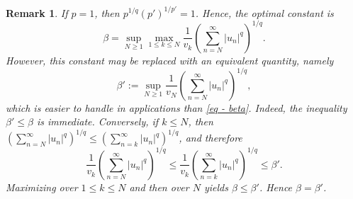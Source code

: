 \documentclass[oneside,10pt]{article}          %
\newtheorem{thm}{Theorem}
\newtheorem{rem}{Remark}
\numberwithin{equation}{section}
\begin{document}
\begin{rem}
    If $p=1$, then $p^{1/q}(p')^{1/p'}=1$. Hence, the optimal constant is \vspace{-1.5pt}
    \begin{equation}\label{eq - beta}
        \beta = \sup_{N\ge1} \max_{1\leq k \leq N} \frac{1}{v_k}\left(\sum_{n=N}^{\infty} |u_n|^q\right)^{\!\!1/q}.
    \end{equation}
    However, this constant may be replaced with an equivalent quantity, namely\vspace{-1.5pt}
    $$
        \beta' := \sup_{N \geq 1} \frac{1}{v_N} \left( \sum_{n = N}^\infty |u_n|^q \right)^{1/q}, 
    $$
    which is easier to handle in applications than \eqref{eq - beta}. Indeed, the inequality $\beta'\le\beta$ is immediate. Conversely, if $k\le N$, then $\left(\sum_{n=N}^{\infty} |u_n|^q\right)^{1/q}\le \left(\sum_{n=k}^{\infty} |u_n|^q\right)^{1/q}$, and therefore
    \[
    \frac{1}{v_k}\left(\sum_{n=N}^{\infty} |u_n|^q\right)^{\!\!1/q}
    \le
    \frac{1}{v_k}\left(\sum_{n=k}^{\infty} |u_n|^q\right)^{\!\!1/q}
    \le
    \beta' .
    \]
    Maximizing over $1\le k\le N$ and then over $N$ yields $\beta\le\beta'$. Hence $\beta=\beta'$.
\end{rem}





\end{document}
